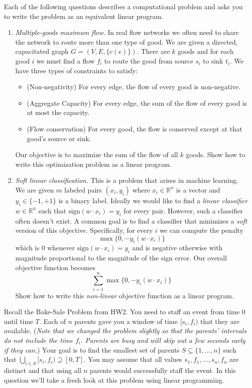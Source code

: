 \documentclass[11pt]{article}
\theoremstyle{definition}
\begin{document}
\begin{enumerate}[leftmargin=0pt, itemsep=3ex]
\problemitem Each of the following questions describes a computational problem and asks you to write the problem as an equivalent linear program.
    \begin{enumerate}[leftmargin=0pt, itemsep=1ex]
        \item \emph{Multiple-goods maximum flow.} In real flow networks we often need to share the network to route more than one type of good.  We are given a directed, capacitated graph $G = (V,E,\{c(e)\})$.  There are $k$ goods and for each good $i$ we must find a flow $f_i$ to route the good from source $s_i$ to sink $t_i$.  We have three types of constraints to satisfy:
        \begin{itemize}[nosep]
            \item (Non-negativity) For every edge, the flow of every good is non-negative.
            \item (Aggregate Capacity) For every edge, the sum of the flow of every good is at most the capacity.
            \item (Flow conservation) For every good, the flow is conserved except at that good's source or sink.
        \end{itemize}
        Our objective is to maximize the sum of the flow of all $k$ goods.  Show how to write this optimization problem as a linear program.
        
        \item \emph{Soft linear classification.} This is a problem that arises in machine learning.  We are given $m$ labeled pairs $(x_i,y_i)$ where $x_i \in \mathbb{R}^n$ is a vector and $y_i \in \{-1,+1\}$ is a binary label.  Ideally we would like to find a \emph{linear classifier} $w \in \mathbb{R}^n$ such that $\mathrm{sign}(w \cdot x_i) = y_i$ for every pair.  However, such a classifier often doesn't exist.  A common goal is to find a classifier that minimizes a \emph{soft} version of this objective.  Specifically, for every $i$ we can compute the penalty $$\max\{ 0, -y_i(w \cdot x_i) \}$$ which is $0$ whenever $\mathrm{sign}(w \cdot x_i) = y_i$ and is negative otherwise with magnitude proportional to the magnitude of the sign error.  Our overall objective function becomes
        $$
            \sum_{i=1}^{n} \max\{0, -y_i(w \cdot x_i)\}
        $$
        Show how to write this \emph{non-linear} objective function as a linear program.
    \end{enumerate}

\problemitem
Recall the Bake-Sale Problem from HW2.  You need to staff an event from time $0$ until time $T$.  Each of $n$ parents gave you a window of time $[s_i,f_i)$ that they are available.  (\emph{Note that we changed the problem slightly so that the parents' intervals do not include the time $f_i$.  Parents are busy and will skip out a few seconds early if they can.})  Your goal is to find the smallest set of parents $S \subseteq \{1,\dots,n\}$ such that $\bigcup_{i \in S} [s_i, f_i) \supseteq [0,T]$.  You may assume that all values $s_1,f_1,\dots,s_n,f_n$ are distinct and that using all $n$ parents would successfully staff the event.  In this question we'll take a fresh look at this problem using linear programming.


\end{enumerate}
\end{document}
